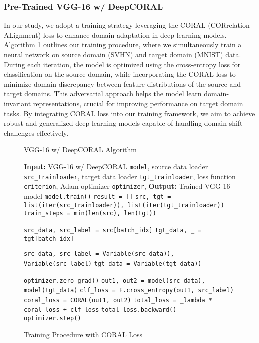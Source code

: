 \documentclass[conference]{IEEEtran}
\begin{document}
\subsubsection{Pre-Trained VGG-16 w/ DeepCORAL}
In our study, we adopt a training strategy leveraging the CORAL (CORrelation ALignment) loss to enhance domain adaptation in deep learning models. Algorithm \ref{alg:training_with_coral} outlines our training procedure, where we simultaneously train a neural network on source domain (SVHN) and target domain (MNIST) data. During each iteration, the model is optimized using the cross-entropy loss for classification on the source domain, while incorporating the CORAL loss to minimize domain discrepancy between feature distributions of the source and target domains. This adversarial approach helps the model learn domain-invariant representations, crucial for improving performance on target domain tasks. By integrating CORAL loss into our training framework, we aim to achieve robust and generalized deep learning models capable of handling domain shift challenges effectively.
\begin{figure}[h]
\centering
\begin{minipage}{.5\textwidth}
\begin{algorithm}[H]
\caption{VGG-16 w/ DeepCORAL Algorithm}
\label{alg:training_with_coral}
\begin{algorithmic}[1]
\scriptsize
\STATE \textbf{Input:} VGG-16 w/ DeepCORAL \texttt{model},
source data loader \texttt{src\_trainloader},
target data loader \texttt{tgt\_trainloader},
loss function \texttt{criterion},
Adam optimizer \texttt{optimizer},
\STATE \textbf{Output:} Trained VGG-16 model
\STATE \texttt{model.train()}
\STATE \texttt{result = []}
\STATE \texttt{src, tgt = list(iter(src\_trainloader)), list(iter(tgt\_trainloader))}
\STATE \texttt{train\_steps = min(len(src), len(tgt))}

    \STATE \texttt{src\_data, src\_label = src[batch\_idx]}
    \STATE \texttt{tgt\_data, \_ = tgt[batch\_idx]}

    \STATE \texttt{src\_data, src\_label = Variable(src\_data)), Variable(src\_label)}
    \STATE \texttt{tgt\_data = Variable(tgt\_data))}

    \STATE \texttt{optimizer.zero\_grad()}
    \STATE \texttt{out1, out2 = model(src\_data), model(tgt\_data)}
    \STATE \texttt{clf\_loss = F.cross\_entropy(out1, src\_label)}
    \STATE \texttt{coral\_loss = CORAL(out1, out2)} 
    \STATE \texttt{total\_loss = \_lambda * coral\_loss + clf\_loss}
    \STATE \texttt{total\_loss.backward()}
    \STATE \texttt{optimizer.step()}
\ENDFOR
\end{algorithmic}
\end{algorithm}
\end{minipage}
\caption{Training Procedure with CORAL Loss}
\end{figure}
\FloatBarrier
\end{document}
